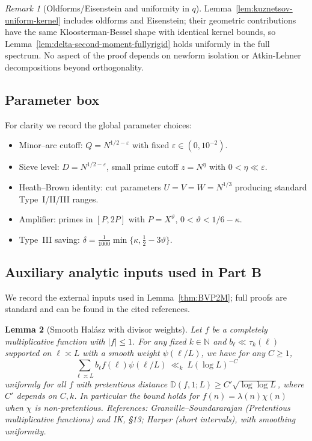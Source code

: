 \documentclass[11pt]{article}
\newtheorem{lemma}{Lemma}[part]
\theoremstyle{definition}
\theoremstyle{remark}
\newtheorem{remark}[lemma]{Remark}
\numberwithin{equation}{part}
\begin{document}
\begin{remark}[Oldforms/Eisenstein and uniformity in $q$]
	Lemma~\ref{lem:kuznetsov-uniform-kernel} includes oldforms and Eisenstein; their geometric contributions have the same Kloosterman-Bessel shape with identical kernel bounds, so Lemma~\ref{lem:delta-second-moment-fullyrigid} holds uniformly in the full spectrum. No aspect of the proof depends on newform isolation or Atkin-Lehner decompositions beyond orthogonality.
\end{remark}

\subsection{Parameter box}

For clarity we record the global parameter choices:
\begin{itemize}
	\item Minor--arc cutoff: $Q=N^{1/2-\varepsilon}$ with fixed $\varepsilon\in(0,10^{-2})$.
	\item Sieve level: $D=N^{1/2-\varepsilon}$, small prime cutoff $z=N^\eta$ with $0<\eta\ll\varepsilon$.
	\item Heath--Brown identity: cut parameters $U=V=W=N^{1/3}$ producing standard Type~I/II/III ranges.
	\item Amplifier: primes in $[P,2P]$ with $P=X^\vartheta$, $0<\vartheta<1/6-\kappa$.
	\item Type~III saving: $\delta=\tfrac{1}{1000}\min\{\kappa,\tfrac12-3\vartheta\}$.
\end{itemize}
\subsection{Auxiliary analytic inputs used in Part B}

We record the external inputs used in Lemma~\ref{thm:BVP2M}; full proofs are standard and can be found in the cited references.

\begin{lemma}[Smooth Hal\'asz with divisor weights]\label{lem:halasz-smooth}
	Let $f$ be a completely multiplicative function with $|f|\le 1$. For any fixed $k\in\mathbb N$ and $b_\ell\ll \tau_k(\ell)$ supported on $\ell\asymp L$ with a smooth weight $\psi(\ell/L)$, we have for any $C\ge 1$,
	\[
		\sum_{\ell\asymp L} b_\ell f(\ell)\psi(\ell/L)\ \ll_{k}\ L(\log L)^{-C}
	\]
	uniformly for all $f$ with pretentious distance $\mathbb D(f,1;L)\ge C'\sqrt{\log\log L}$, where $C'$ depends on $C,k$. In particular the bound holds for $f(n)=\lambda(n)\chi(n)$ when $\chi$ is non-pretentious. References: Granville--Soundararajan (Pretentious multiplicative functions) and IK, §13; Harper (short intervals), with smoothing uniformity.
\end{lemma}
\end{document}
